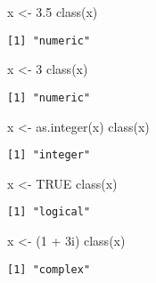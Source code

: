 \documentclass[
  letterpaper,
  DIV=11,
  numbers=noendperiod]{scrreprt}
\newenvironment{Shaded}{\begin{snugshade}}{\end{snugshade}}
\newcommand{\ConstantTok}[1]{\textcolor[rgb]{0.56,0.35,0.01}{#1}}
\newcommand{\DecValTok}[1]{\textcolor[rgb]{0.68,0.00,0.00}{#1}}
\newcommand{\FloatTok}[1]{\textcolor[rgb]{0.68,0.00,0.00}{#1}}
\newcommand{\FunctionTok}[1]{\textcolor[rgb]{0.28,0.35,0.67}{#1}}
\newcommand{\NormalTok}[1]{\textcolor[rgb]{0.00,0.23,0.31}{#1}}
\newcommand{\OtherTok}[1]{\textcolor[rgb]{0.00,0.23,0.31}{#1}}
\newcommand{\SpecialCharTok}[1]{\textcolor[rgb]{0.37,0.37,0.37}{#1}}
\begin{document}
\begin{Shaded}
\begin{Highlighting}[]
\NormalTok{x }\OtherTok{\textless{}{-}} \FloatTok{3.5}  
\FunctionTok{class}\NormalTok{(x)}
\end{Highlighting}
\end{Shaded}

\begin{verbatim}
[1] "numeric"
\end{verbatim}

\begin{Shaded}
\begin{Highlighting}[]
\NormalTok{x }\OtherTok{\textless{}{-}} \DecValTok{3}  
\FunctionTok{class}\NormalTok{(x)}
\end{Highlighting}
\end{Shaded}

\begin{verbatim}
[1] "numeric"
\end{verbatim}

\begin{Shaded}
\begin{Highlighting}[]
\NormalTok{x }\OtherTok{\textless{}{-}} \FunctionTok{as.integer}\NormalTok{(x)}
\FunctionTok{class}\NormalTok{(x)}
\end{Highlighting}
\end{Shaded}

\begin{verbatim}
[1] "integer"
\end{verbatim}

\begin{Shaded}
\begin{Highlighting}[]
\NormalTok{x }\OtherTok{\textless{}{-}} \ConstantTok{TRUE}  
\FunctionTok{class}\NormalTok{(x)}
\end{Highlighting}
\end{Shaded}

\begin{verbatim}
[1] "logical"
\end{verbatim}

\begin{Shaded}
\begin{Highlighting}[]
\NormalTok{x }\OtherTok{\textless{}{-}}\NormalTok{ (}\DecValTok{1} \SpecialCharTok{+} \DecValTok{3}\NormalTok{i)  }
\FunctionTok{class}\NormalTok{(x)}
\end{Highlighting}
\end{Shaded}

\begin{verbatim}
[1] "complex"
\end{verbatim}
\end{document}
